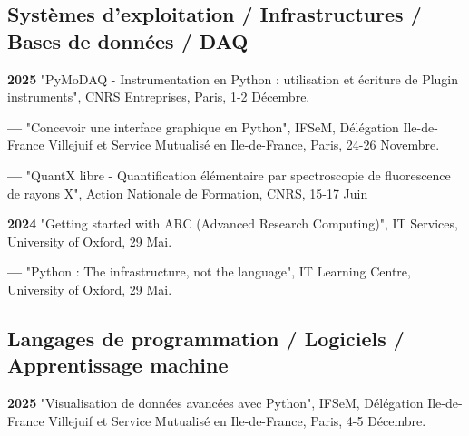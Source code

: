\documentclass{article}
\newcommand{\fr}[1]{#1}       %
\newcommand{\en}[1]{}     %
\begin{document}
\subsection*{\fr{Systèmes d'exploitation / Infrastructures / Bases de données / DAQ}\en{Operating Systems / Infrastructure / Databases / DAQ}}


\textbf{2025 }
\fr{"PyMoDAQ - Instrumentation en Python : utilisation et écriture de Plugin instruments", CNRS Entreprises, Paris, 1-2 Décembre.}
\en{"PyMoDAQ - Instrumentation in Python : usage and writing of instrument plugins", CNRS Entreprises, Paris, December 1-2.}
\smallbreak

\textbf{--- }
\fr{"Concevoir une interface graphique en Python", IFSeM, Délégation Ile-de-France Villejuif et Service Mutualisé en Ile-de-France, Paris, 24-26 Novembre.}
\en{"Designing Graphical Interfaces in Python", IFSeM, Délégation Ile-de-France Villejuif and Service Mutualisé en Ile-de-France, Paris, November 24-26.}
\smallbreak

\textbf{--- }
\fr{"QuantX libre - Quantification élémentaire par spectroscopie de fluorescence de rayons X", Action Nationale de Formation, CNRS, 15-17 Juin}
\en{"QuantX libre - Elemental Quantification by X-ray Fluorescence Spectroscopy", Action Nationale de Formation, CNRS, 15-17 June}
\smallbreak

\textbf{2024 }
\fr{"Getting started with ARC (Advanced Research Computing)", IT Services, University of Oxford, 29 Mai.}
\en{"Getting started with ARC (Advanced Research Computing)", IT Services, University of Oxford, May 29.}
\smallbreak

\textbf{--- }
\fr{"\textsf{Python} : The infrastructure, not the language", IT Learning Centre, University of Oxford, 29 Mai.}
\en{"\textsf{Python}: The infrastructure, not the language", IT Learning Centre, University of Oxford, May 29.}

\smallbreak

\subsection*{\fr{Langages de programmation / Logiciels / Apprentissage machine}\en{Programming Languages / Software / Machine Learning}}

\textbf{2025 }
\fr{"Visualisation de données avancées avec Python", IFSeM, Délégation Ile-de-France Villejuif et Service Mutualisé en Ile-de-France, Paris, 4-5 Décembre.}
\en{"Advanced Data Visualization with Python", IFSeM, Délégation Ile-de-France Villejuif and Service Mutualisé en Ile-de-France, Paris, December 4-5.}
\smallbreak
\end{document}
